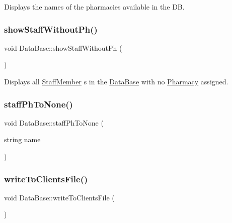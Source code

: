 Displays the names of the pharmacies available in the DB. 

\mbox{\label{classDataBase_ab17fba12d1810b3548615b3ac0427850}} 
\subsubsection{\texorpdfstring{show\+Staff\+Without\+Ph()}{showStaffWithoutPh()}}
{\footnotesize\ttfamily void Data\+Base\+::show\+Staff\+Without\+Ph (\begin{DoxyParamCaption}{ }\end{DoxyParamCaption})}



Displays all \hyperlink{classStaffMember}{Staff\+Member} \textquotesingle{}s in the \hyperlink{classDataBase}{Data\+Base} with no \hyperlink{classPharmacy}{Pharmacy} assigned. 

\mbox{\label{classDataBase_a85445c22323399e318780faf36854c2f}} 
\subsubsection{\texorpdfstring{staff\+Ph\+To\+None()}{staffPhToNone()}}
{\footnotesize\ttfamily void Data\+Base\+::staff\+Ph\+To\+None (\begin{DoxyParamCaption}\item[{string}]{name }\end{DoxyParamCaption})}

\mbox{\label{classDataBase_a4d855ccf967f4f741646100d2c890ede}} 
\subsubsection{\texorpdfstring{write\+To\+Clients\+File()}{writeToClientsFile()}}
{\footnotesize\ttfamily void Data\+Base\+::write\+To\+Clients\+File (\begin{DoxyParamCaption}{ }\end{DoxyParamCaption})}


